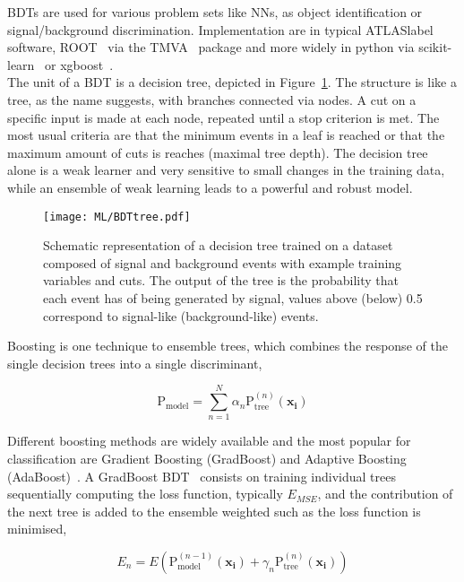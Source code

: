 BDTs are used for various problem sets like NNs, as object identification or signal/background discrimination. Implementation are in typical \acrshort{ATLASlabel} software, ROOT~\cite{BRUN199781} via the TMVA~\cite{TMVA} package and more widely in python via scikit-learn~\cite{scikit-learn} or xgboost~\cite{Chen_2016}.\\

The unit of a BDT is a decision tree, depicted in Figure~\ref{ML:BDT}. The structure is like a tree, as the name suggests, with branches connected via nodes. A cut on a specific input is made at each node, repeated until a stop criterion is met. The most usual criteria are that the minimum events in a leaf is reached or that the maximum amount of cuts is reaches (maximal tree depth). The decision tree alone is a weak learner and very sensitive to small changes in the training data, while an ensemble of weak learning leads to a powerful and robust model.
 
\begin{figure}[htbp]
    \RawFloats
    \begin{center}
    \texttt{[image: ML/BDTtree.pdf]}
    \caption{
        Schematic representation of a decision tree trained on a dataset composed of signal and background events with example training variables and cuts. The output of the tree is the probability that each event has of being generated by signal, values above (below) 0.5 correspond to signal-like (background-like) events.
    }
    \label{ML:BDT}
    \end{center}
\end{figure}

Boosting is one technique to ensemble trees, which combines the response of the single decision trees into a single discriminant,

\begin{equation}
    \text{P}_{\text{model}} = \sum_{n=1}^N \alpha_n \text{P}_{\text{tree}}^{(n)}(\mathbf{x_i})
\end{equation}

Different boosting methods are widely available and the most popular for classification are Gradient Boosting (GradBoost) and Adaptive Boosting (AdaBoost)~\cite{FREUND1997119}. A GradBoost BDT~\cite{Chen_2016} consists on training individual trees sequentially computing the loss function, typically $E_{MSE}$, and the contribution of the next tree is added to the ensemble weighted such as the loss function is minimised,

\begin{equation}
    E_n = E\left(\text{P}_{\text{model}}^(n-1)(\mathbf{x_i})+\gamma_n \text{P}_{\text{tree}}^{(n)}(\mathbf{x_i})\right)
\end{equation}

